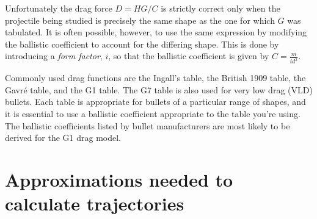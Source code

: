 \documentclass[12pt]{article}
\begin{document}
Unfortunately the drag force $D=HG/C$ is strictly correct only when
the projectile being studied is precisely the same shape as the one
for which $G$ was tabulated.  It is often possible, however, to use
the same expression by modifying the ballistic coefficient to account
for the differing shape.  This is done by introducing a {\em form
factor}, $i$, so that the ballistic coefficient is given by
$C=\frac{m}{id^2}$.

Commonly used drag functions are the Ingall's table, the British
1909 table, the Gavr\'e table, and the G1 table.  The G7 table is also
used for very low drag (VLD) bullets.  Each table is appropriate for
bullets of a particular range of shapes, and it is essential to use a
ballistic coefficient appropriate to the table you're using.  The
ballistic coefficients listed by bullet manufacturers are most likely
to be derived for the G1 drag model.

\section{Approximations needed to calculate trajectories}
\end{document}
